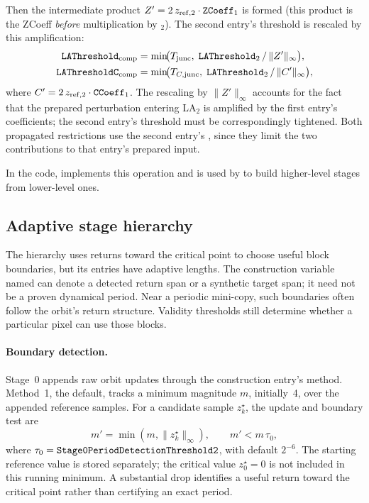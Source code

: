 Then the intermediate product
\(Z' = 2\,z_\mathrm{ref,2} \cdot \texttt{ZCoeff}_1\) is formed
(this product is the ZCoeff \emph{before} multiplication by \(_2\)).
The second entry's threshold is rescaled by this amplification:
\begin{align}
\texttt{LAThreshold}_\mathrm{comp}
  &= \min\!\bigl(
       T_\mathrm{junc},\;
       \texttt{LAThreshold}_2 \,/\, \lVert Z' \rVert_\infty
     \bigr),
\\
\texttt{LAThresholdC}_\mathrm{comp}
  &= \min\!\bigl(
       T_{C,\mathrm{junc}},\;
       \texttt{LAThreshold}_2 \,/\, \lVert C' \rVert_\infty
     \bigr),
\end{align}
where \(C' = 2\,z_\mathrm{ref,2} \cdot \texttt{CCoeff}_1\).
The rescaling by \(\lVert Z' \rVert_\infty\) accounts for the fact that
the prepared perturbation entering LA\(_2\) is amplified by the first
entry's coefficients; the second entry's threshold must be correspondingly
tightened.
Both propagated restrictions use the second entry's
, since they limit the two contributions to that
entry's prepared input.

In the code,  implements this operation and
is used by  to build higher-level stages from
lower-level ones.

\subsection{Adaptive stage hierarchy}
\label{sec:la-stage-hierarchy}

The hierarchy uses returns toward the critical point to choose useful
block boundaries, but its entries have adaptive lengths. The
construction variable named  can denote a detected return
span or a synthetic target span; it need not be a proven dynamical
period. Near a periodic mini-copy, such boundaries often follow the
orbit's return structure. Validity thresholds still determine whether
a particular pixel can use those blocks.

\paragraph{Boundary detection.}
Stage~0 appends raw orbit updates through the construction entry's
 method.
Method~1, the default, tracks a minimum magnitude $m$, initially~4,
over the appended reference samples. For a candidate sample $z_k^\star$,
the update and boundary test are
\begin{equation}
m'=\min(m,\lVert z_k^\star\rVert_\infty),\qquad
m'<m\,\tau_0,
\label{eq:period-detect-minmag}
\end{equation}
where $\tau_0=\texttt{Stage0PeriodDetectionThreshold2}$, with default
$2^{-6}$. The starting reference value is stored separately; the
critical value $z_0^\star=0$ is not included in this running minimum.
A substantial drop identifies a useful return toward the critical
point rather than certifying an exact period.


